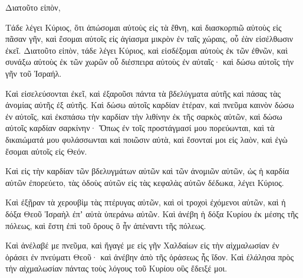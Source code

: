 {Διατοῦτο εἰπὸν,
\par }{\PP Τάδε λέγει Κύριος, ὅτι ἀπώσομαι αὐτοὺς εἰς τὰ ἔθνη, καὶ διασκορπιῶ αὐτοὺς εἰς πᾶσαν γῆν, καὶ ἔσομαι αὐτοῖς εἰς ἁγίασμα μικρὸν ἐν ταῖς χώραις, οὗ ἐὰν εἰσέλθωσιν ἐκεῖ.
Διατοῦτο εἰπὸν, τάδε λέγει Κύριος, καὶ εἰσδέξομαι αὐτοὺς ἐκ τῶν ἐθνῶν, καὶ συνάξω αὐτοὺς ἐκ τῶν χωρῶν οὗ διέσπειρα αὐτοὺς ἐν αὐταῖς· καὶ δώσω αὐτοῖς τὴν γῆν τοῦ Ἰσραήλ.
\par }{\PP {}Καὶ εἰσελεύσονται ἐκεῖ, καὶ ἐξαροῦσι πάντα τὰ βδελύγματα αὐτῆς καὶ πάσας τὰς ἀνομίας αὐτῆς ἐξ αὐτῆς.
Καὶ δώσω αὐτοῖς καρδίαν ἑτέραν, καὶ πνεῦμα καινὸν δώσω ἐν αὐτοῖς, καὶ ἐκσπάσω τὴν καρδίαν τὴν λιθίνην ἐκ τῆς σαρκὸς αὐτῶν, καὶ δώσω αὐτοῖς καρδίαν σαρκίνην·
Ὅπως ἐν τοῖς προστάγμασί μου πορεύωνται, καὶ τὰ δικαιώματά μου φυλάσσωνται καὶ ποιῶσιν αὐτὰ, καὶ ἔσονταί μοι εἰς λαὸν, καὶ ἐγὼ ἔσομαι αὐτοῖς εἰς Θεόν.
\par }{\PP {}Καὶ εἰς τὴν καρδίαν τῶν βδελυγμάτων αὐτῶν καὶ τῶν ἀνομιῶν αὐτῶν, ὡς ἡ καρδία αὐτῶν ἐπορεύετο, τὰς ὁδοὺς αὐτῶν εἰς τὰς κεφαλὰς αὐτῶν δέδωκα, λέγει Κύριος.
\par }{\PP {}Καὶ ἐξῇραν τὰ χερουβὶμ τὰς πτέρυγας αὐτῶν, καὶ οἱ τροχοὶ ἐχόμενοι αὐτῶν, καὶ ἡ δόξα Θεοῦ Ἰσραὴλ ἐπʼ αὐτὰ ὑπεράνω αὐτῶν.
Καὶ ἀνέβη ἡ δόξα Κυρίου ἐκ μέσης τῆς πόλεως, καὶ ἔστη ἐπὶ τοῦ ὄρους ὃ ἦν ἀπέναντι τῆς πόλεως.
\par }{\PP {}Καὶ ἀνέλαβέ με πνεῦμα, καὶ ἤγαγέ με εἰς γῆν Χαλδαίων εἰς τὴν αἰχμαλωσίαν ἐν ὁράσει ἐν πνεύματι Θεοῦ· καὶ ἀνέβην ἀπὸ τῆς ὁράσεως ἧς ἴδον.
Καὶ ἐλάλησα πρὸς τὴν αἰχμαλωσίαν πάντας τοὺς λόγους τοῦ Κυρίου οὓς ἔδειξέ μοι.

}
